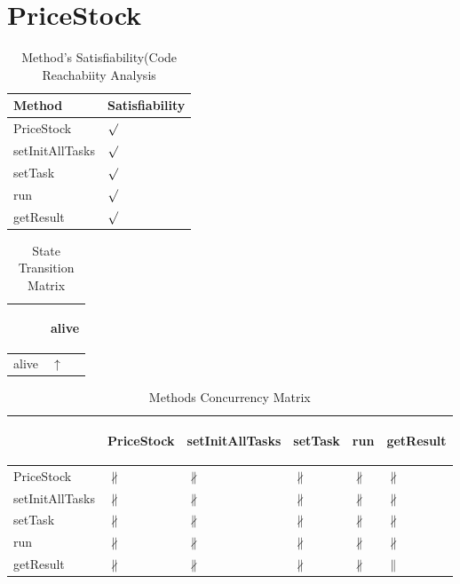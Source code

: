 \documentclass[10pt]{article}
\begin{document}
\section{{\color{Fuchsia}PriceStock}}
\label{PriceStock}
\begin{longtable}{|l|l|}
\caption{Method's Satisfiability(Code Reachabiity Analysis}\\
\hline
Method & Satisfiability\\
\hline
PriceStock&{\color{blue}$\surd$}\\
\hline
setInitAllTasks&{\color{blue}$\surd$}\\
\hline
setTask&{\color{blue}$\surd$}\\
\hline
run&{\color{blue}$\surd$}\\
\hline
getResult&{\color{blue}$\surd$}\\
\hline
\end{longtable}
\begin{longtable}{|l|l|}
\caption{State Transition Matrix}\\
\hline
&\begin{sideways}alive\end{sideways}\\
\hline
alive&{\color{blue}$\uparrow$}\\
\hline
\end{longtable}
\begin{longtable}{|l|l|l|l|l|l|}
\caption{Methods Concurrency Matrix}\\
\hline
&\begin{sideways}PriceStock\end{sideways}&\begin{sideways}setInitAllTasks\end{sideways}&\begin{sideways}setTask\end{sideways}&\begin{sideways}run\end{sideways}&\begin{sideways}getResult\end{sideways}\\
\hline
PriceStock&{\color{BrickRed}$\nparallel$}&{\color{BrickRed}$\nparallel$}&{\color{BrickRed}$\nparallel$}&{\color{BrickRed}$\nparallel$}&{\color{BrickRed}$\nparallel$}\\
\hline
setInitAllTasks&{\color{BrickRed}$\nparallel$}&{\color{BrickRed}$\nparallel$}&{\color{BrickRed}$\nparallel$}&{\color{BrickRed}$\nparallel$}&{\color{BrickRed}$\nparallel$}\\
\hline
setTask&{\color{BrickRed}$\nparallel$}&{\color{BrickRed}$\nparallel$}&{\color{BrickRed}$\nparallel$}&{\color{BrickRed}$\nparallel$}&{\color{BrickRed}$\nparallel$}\\
\hline
run&{\color{BrickRed}$\nparallel$}&{\color{BrickRed}$\nparallel$}&{\color{BrickRed}$\nparallel$}&{\color{BrickRed}$\nparallel$}&{\color{BrickRed}$\nparallel$}\\
\hline
getResult&{\color{BrickRed}$\nparallel$}&{\color{BrickRed}$\nparallel$}&{\color{BrickRed}$\nparallel$}&{\color{BrickRed}$\nparallel$}&{\color{blue}$\parallel$}\\
\hline
\end{longtable}
\newpage
\end{document}
